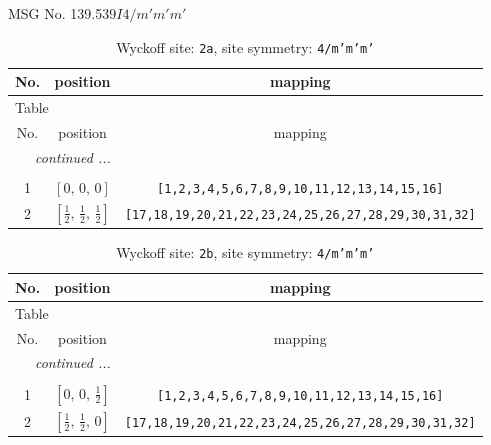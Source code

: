 \documentclass[fleqn,8pt]{jsarticle}
\begin{document}
\setcounter{MaxMatrixCols}{32}

\renewcommand{\tablename}{Table~}
\renewcommand{\figurename}{Figure~}
\begin{center}
\LARGE
MSG No. 139.539\quad$I4/m'm'm'$
\end{center}
\renewcommand{\arraystretch}{1.2}
\begin{longtable}{ccc}
\caption{Wyckoff site: {\tt 2a}, site symmetry: {\tt 4/m'm'm'}}
 \\
 \hline \hline
No. & position & mapping \\ \hline \endfirsthead

\multicolumn{2}{l}{\tablename\ \thetable{}} \\
 \hline \hline
No. & position & mapping \\ \hline \endhead

 \hline \hline
\multicolumn{2}{r}{\footnotesize\it continued ...} \\ \endfoot

 \hline \hline
\multicolumn{2}{r}{} \\ \endlastfoot

1 & $\left[ 0,\, 0,\, 0 \right]$ & {\tt [1,2,3,4,5,6,7,8,9,10,11,12,13,14,15,16]} \\ \hline
2 & $\left[ \frac{1}{2},\, \frac{1}{2},\, \frac{1}{2} \right]$ & {\tt [17,18,19,20,21,22,23,24,25,26,27,28,29,30,31,32]} \\
\end{longtable}
\renewcommand{\arraystretch}{1.2}
\begin{longtable}{ccc}
\caption{Wyckoff site: {\tt 2b}, site symmetry: {\tt 4/m'm'm'}}
 \\
 \hline \hline
No. & position & mapping \\ \hline \endfirsthead

\multicolumn{2}{l}{\tablename\ \thetable{}} \\
 \hline \hline
No. & position & mapping \\ \hline \endhead

 \hline \hline
\multicolumn{2}{r}{\footnotesize\it continued ...} \\ \endfoot

 \hline \hline
\multicolumn{2}{r}{} \\ \endlastfoot

1 & $\left[ 0,\, 0,\, \frac{1}{2} \right]$ & {\tt [1,2,3,4,5,6,7,8,9,10,11,12,13,14,15,16]} \\ \hline
2 & $\left[ \frac{1}{2},\, \frac{1}{2},\, 0 \right]$ & {\tt [17,18,19,20,21,22,23,24,25,26,27,28,29,30,31,32]} \\
\end{longtable}
\end{document}
